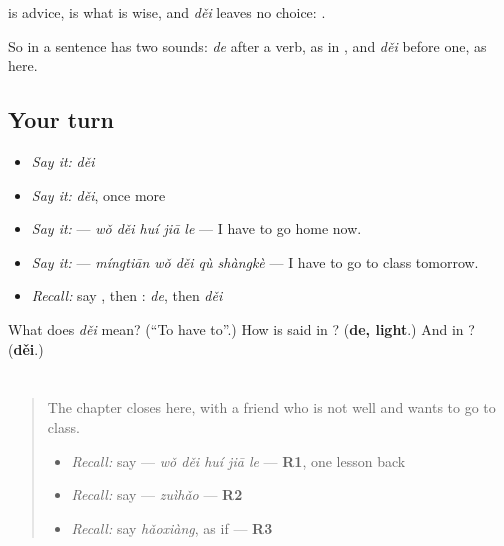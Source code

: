 \begin{grammarlens}[title={What you've built}]
 is advice,  is what is wise, and \emph{děi} leaves no choice: .

So  in a sentence has two sounds: \emph{de} after a verb, as in , and \emph{děi} before one, as here.
\end{grammarlens}

\subsection*{Your turn}
\begin{itemize}
\raggedright
  \item \emph{Say it:} \emph{děi}
  \item \emph{Say it:} \emph{děi}, once more
  \item \emph{Say it:}  — \emph{wǒ děi huí jiā le} — I have to go home now.
  \item \emph{Say it:}  — \emph{míngtiān wǒ děi qù shàngkè} — I have to go to class tomorrow.
  \item \emph{Recall:} say , then : \emph{de}, then \emph{děi}
\end{itemize}

\begin{tcolorbox}[breakable,colback=teal!4,colframe=teal!35!black,title={Before you move on}]
What does \emph{děi} mean? (\textquotedblleft{}To have to\textquotedblright{}.) How is  said in ? (\textbf{de, light}.) And in ? (\textbf{děi}.)
\end{tcolorbox}
\section[Practice]{ }

\label{lesson:ZH-C282-practice}



\begin{quote}
The chapter closes here, with a friend who is not well and wants to go to class.

\begin{itemize}
\raggedright
  \item \emph{Recall:} say  — \emph{wǒ děi huí jiā le} — \textbf{R1}, one lesson back
  \item \emph{Recall:} say  — \emph{zuìhǎo} — \textbf{R2}
  \item \emph{Recall:} say \emph{hǎoxiàng}, as if — \textbf{R3}
\end{itemize}
\end{quote}

